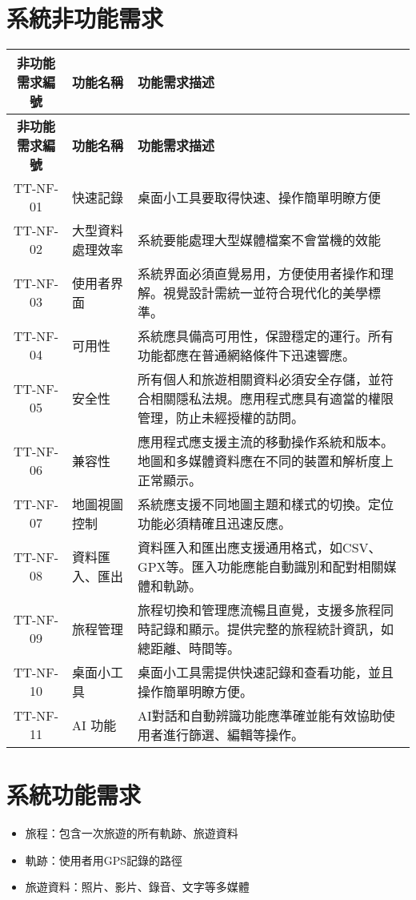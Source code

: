 \documentclass[12pt]{article}
\begin{document}
\section{系統非功能需求}

\begin{longtable}{|c|p{5.2cm}|p{7.5cm}|}
  \hline
  \textbf{非功能需求編號} & \textbf{功能名稱} & \textbf{功能需求描述} \\
  \hline
  \endfirsthead
  \hline
  \textbf{非功能需求編號} & \textbf{功能名稱} & \textbf{功能需求描述} \\
  \hline
  \endhead
  TT-NF-01 & 快速記錄 & 桌面小工具要取得快速、操作簡單明瞭方便 \\
  \hline
  TT-NF-02 & 大型資料處理效率 & 系統要能處理大型媒體檔案不會當機的效能 \\
  \hline
  TT-NF-03 & 使用者界面 & 系統界面必須直覺易用，方便使用者操作和理解。視覺設計需統一並符合現代化的美學標準。 \\
  \hline
  TT-NF-04 & 可用性 & 系統應具備高可用性，保證穩定的運行。所有功能都應在普通網絡條件下迅速響應。 \\
  \hline
  TT-NF-05 & 安全性 & 所有個人和旅遊相關資料必須安全存儲，並符合相關隱私法規。應用程式應具有適當的權限管理，防止未經授權的訪問。 \\
  \hline
  TT-NF-06 & 兼容性 & 應用程式應支援主流的移動操作系統和版本。地圖和多媒體資料應在不同的裝置和解析度上正常顯示。 \\
  \hline
  TT-NF-07 & 地圖視圖控制 & 系統應支援不同地圖主題和樣式的切換。定位功能必須精確且迅速反應。 \\
  \hline
  TT-NF-08 & 資料匯入、匯出 & 資料匯入和匯出應支援通用格式，如CSV、GPX等。匯入功能應能自動識別和配對相關媒體和軌跡。 \\
  \hline
  TT-NF-09 & 旅程管理 & 旅程切換和管理應流暢且直覺，支援多旅程同時記錄和顯示。提供完整的旅程統計資訊，如總距離、時間等。 \\
  \hline
  TT-NF-10 & 桌面小工具 & 桌面小工具需提供快速記錄和查看功能，並且操作簡單明瞭方便。 \\
  \hline
  TT-NF-11 & AI 功能 & AI對話和自動辨識功能應準確並能有效協助使用者進行篩選、編輯等操作。 \\
  \hline
\end{longtable}

\section{系統功能需求}

\begin{itemize}
  \item 旅程：包含一次旅遊的所有軌跡、旅遊資料
  \item 軌跡：使用者用GPS記錄的路徑
  \item 旅遊資料：照片、影片、錄音、文字等多媒體
\end{itemize}
\end{document}
